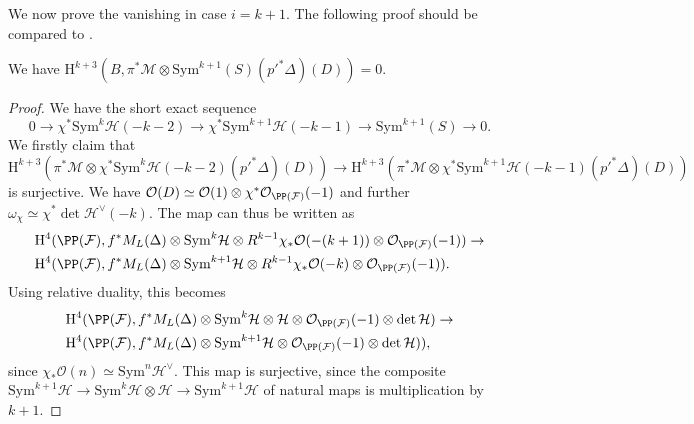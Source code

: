 We now prove the vanishing in case $i=k+1$. The following proof should be compared to \cite[Lemma 8]{V2}.
\begin{prop}
\notready \label{green-odd-main}
We have $\mathrm{H}^{k+3}(B,\pi^* \mathcal{M} \otimes \mathrm{Sym}^{k+1}(S) ({p'}^*\Delta)(D))=0$.
 \end{prop}
\begin{proof}
We have the short exact sequence
$$0 \to \chi^* \mathrm{Sym}^{k} \mathcal{H} (-k-2) \to \chi^*\mathrm{Sym}^{k+1} \mathcal{H} (-k-1) \to \mathrm{Sym}^{k+1}(S) \to 0.$$
We firstly claim that $$\mathrm{H}^{k+3}(\pi^* \mathcal{M} \otimes  \chi^* \mathrm{Sym}^{k} \mathcal{H} (-k-2)  ({p'}^*\Delta)(D))\to \mathrm{H}^{k+3}(\pi^* \mathcal{M} \otimes  \chi^*\mathrm{Sym}^{k+1} \mathcal{H} (-k-1)  ({p'}^*\Delta)(D))$$
is surjective. We have $\mathcal{O}(D) \simeq \mathcal{O}(1)\otimes \chi^*\mathcal{O}_{\PP(\mathcal{F})}(-1)$ and further $\omega_{\chi}\simeq \chi^*\det \mathcal{H}^{\vee}(-k)$. The map can thus be written as
{\small{\begin{align*}
&\mathrm{H}^4(\PP(\mathcal{F}),f^*M_L(\Delta) \otimes \mathrm{Sym}^k\mathcal{H} \otimes R^{k-1}\chi_*\mathcal{O}(-(k+1))\otimes \mathcal{O}_{\PP(\mathcal{F})}(-1)) \to  \\
&\mathrm{H}^4(\PP(\mathcal{F}),f^*M_L(\Delta) \otimes \mathrm{Sym}^{k+1}\mathcal{H} \otimes R^{k-1}\chi_*\mathcal{O}(-k)\otimes \mathcal{O}_{\PP(\mathcal{F})}(-1)) .
\end{align*}}}
Using relative duality, this becomes
{\small{\begin{align*}
&\mathrm{H}^4(\PP(\mathcal{F}),f^*M_L(\Delta) \otimes \mathrm{Sym}^k\mathcal{H} \otimes \mathcal{H} \otimes \mathcal{O}_{\PP(\mathcal{F})}(-1)\otimes \det \mathcal{H}) \to  \\
&\mathrm{H}^4(\PP(\mathcal{F}),f^*M_L(\Delta) \otimes \mathrm{Sym}^{k+1}\mathcal{H} \otimes \mathcal{O}_{\PP(\mathcal{F})}(-1)\otimes \det \mathcal{H})),
\end{align*}}}
since $\chi_*\mathcal{O}(n)\simeq \mathrm{Sym}^n\mathcal{H}^{\vee}$. This map is surjective, since the composite $ \mathrm{Sym}^{k+1}\mathcal{H} \to \mathrm{Sym}^k\mathcal{H} \otimes \mathcal{H} \to \mathrm{Sym}^{k+1}\mathcal{H} $ of natural maps is multiplication by $k+1$.


\end{proof}
